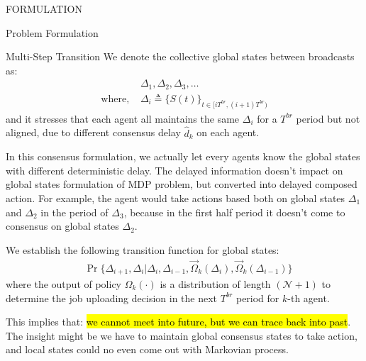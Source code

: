 \documentclass[10pt, conference, letterpaper]{IEEEtran}
\begin{document}
\begin{section}{FORMULATION}
\begin{subsection}{Problem Formulation}
\begin{subsubsection}{Multi-Step Transition}
                We denote the collective global states between broadcasts as:
                \begin{align}
                    & \Delta_1, \Delta_2, \Delta_3, \dots
                    \\
                    \text{where, } & \Delta_i \triangleq \{S(t)\}_{t \in [iT^{br},(i+1)T^{br})} \nonumber
                \end{align}
                and it stresses that each agent all maintains the same $\Delta_i$ for a $T^{br}$ period but not aligned, due to different consensus delay $\hat{d}_k$ on each agent.
                
                In this consensus formulation, we actually let every agents know the global states with different deterministic delay. The delayed information doesn't impact on global states formulation of MDP problem, but converted into delayed composed action. For example, the agent would take actions based both on global states $\Delta_1$ and $\Delta_2$ in the period of $\Delta_3$, because in the first half period it doesn't come to consensus on global states $\Delta_2$.

                We establish the following transition function for global states:
                \begin{align}
                    & \Pr\{\Delta_{i+1}, \Delta_{i} | \Delta_{i}, \Delta_{i-1}, \vec{\Omega}_k(\Delta_i), \vec{\Omega}_k(\Delta_{i-1})\}
                \end{align}
                where the output of policy $\Omega_k(\cdot)$ is a distribution of length $(\mathcal{N}+1)$ to determine the job uploading decision in the next $T^{br}$ period for $k$-th agent.

                This implies that: \hl{we cannot meet into future, but we can trace back into past}. The insight might be we have to maintain global consensus states to take action, and local states could no even come out with Markovian process.


\end{subsubsection}
\end{subsection}
\end{section}
\end{document}
